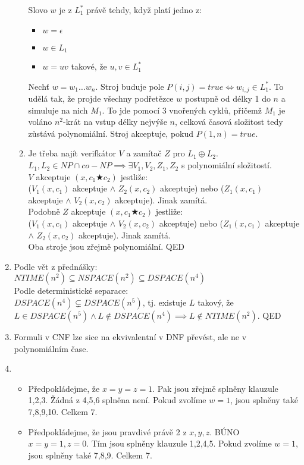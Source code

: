 \documentclass[a4wide,8pt]{extarticle}
\begin{document}
\begin{enumerate}
\begin{enumerate}
			Slovo $w$ je z $L_1^*$ právě tehdy, když platí jedno z:
			\begin{itemize}
				\item $w=\epsilon$
				\item $w\in L_1$
				\item $w=uv$ takové, že $u,v \in L_1^*$
			\end{itemize}
			Nechť $w=w_1\dots w_n$. Stroj buduje pole $P(i,j)=true \iff w_{i,j}\in L_1^*$. To udělá tak, že projde všechny podřetězce $w$ postupně od délky 1 do $n$ a simuluje na nich $M_1$. To jde pomocí 3 vnořených cyklů, přičemž $M_1$ je voláno $n^2$-krát na vstup délky nejvýše $n$, celková časová složitost tedy zůstává polynomiální. Stroj akceptuje, pokud $P(1,n)=true$.
		\item
			Je třeba najít verifkátor $V$ a zamítač $Z$ pro $L_1\oplus L_2$. $L_1,L_2\in NP\cap co-NP\implies \exists V_1,V_2,Z_1,Z_2$ s polynomiální složitostí.\\
			$V$ akceptuje $(x,c_1\bigstar c_2)$ jestliže:\\
			($V_1(x,c_1)$ akceptuje $\wedge$ $Z_2(x,c_2)$ akceptuje) nebo ($Z_1(x,c_1)$ akceptuje $\wedge$ $V_2(x,c_2)$ akceptuje). Jinak zamítá.\\
			Podobně $Z$ akceptuje $(x,c_1\bigstar c_2)$ jestliže:\\
			($V_1(x,c_1)$ akceptuje $\wedge$ $V_2(x,c_2)$ akceptuje) nebo ($Z_1(x,c_1)$ akceptuje $\wedge$ $Z_2(x,c_2)$ akceptuje). Jinak zamítá.\\
			Oba stroje jsou zřejmě polynomiální. QED
	\end{enumerate}
	\item
		Podle vět z přednášky:\\
		$NTIME(n^2)\subseteq NSPACE(n^2)\subseteq DSPACE(n^4)$\\
		Podle deterministické separace:\\
		$DSPACE(n^4)\subsetneq DSPACE(n^5)$, tj. existuje $L$ takový, že $L\in DSPACE(n^5) \wedge L\notin DSPACE(n^4) \implies L\notin NTIME(n^2)$. QED
	\item
		Formuli v CNF lze sice na ekvivalentní v DNF převést, ale ne v polynomiálním čase.
	\item
		\begin{itemize}
			\item Předpokládejme, že $x=y=z=1$. Pak jsou zřejmě splněny klauzule 1,2,3. Žádná z 4,5,6 splněna není. Pokud zvolíme $w=1$, jsou splněny také 7,8,9,10. Celkem 7.
			\item Předpokládejme, že jsou pravdivé právě 2 z $x,y,z$. BÚNO $x=y=1, z=0$. Tím jsou splněny klauzule 1,2,4,5. Pokud zvolíme $w=1$, jsou splněny také 7,8,9. Celkem 7.

\end{itemize}
\end{enumerate}
\end{document}
